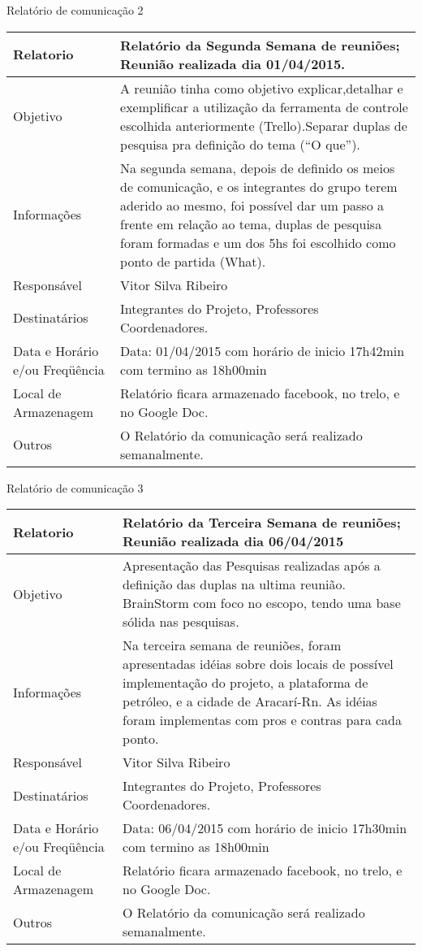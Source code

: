 \begin{center}
{\large Relatório de comunicação 2}
\begin{table}[h]
\begin{tabular}{|p{6cm}|p{9cm}|}\hline
Relatorio & Relatório da Segunda Semana de reuniões; Reunião realizada dia 01/04/2015.\\ \hline
Objetivo & A reunião tinha como objetivo explicar,detalhar e exemplificar a utilização da ferramenta de controle escolhida anteriormente (Trello).Separar duplas de pesquisa pra definição do tema (“O que”).\\ \hline
Informações & Na segunda semana, depois de definido os meios de comunicação, e os integrantes do grupo terem aderido ao mesmo, foi possível dar um passo a frente em relação ao tema, duplas de pesquisa foram formadas e um dos 5hs foi escolhido como ponto de partida (What).\\ \hline
Responsável & Vitor Silva Ribeiro\\ \hline
Destinatários & Integrantes do Projeto, Professores Coordenadores.\\ \hline
Data e Horário e/ou Freqüência & Data: 01/04/2015 com horário de inicio 17h42min com termino as 18h00min\\ \hline
Local de Armazenagem & Relatório ficara armazenado facebook, no trelo, e no Google Doc.\\ \hline
Outros & O Relatório da comunicação será realizado semanalmente.\\ \hline
\end{tabular}
\end{table}
\newpage

{\large Relatório de comunicação 3}
\begin{table}[h]
\begin{tabular}{|p{6cm}|p{9cm}|}\hline
Relatorio & Relatório da Terceira Semana de reuniões; Reunião realizada dia 06/04/2015\\ \hline
Objetivo & Apresentação das Pesquisas realizadas após a definição das duplas na ultima reunião. BrainStorm com foco  no escopo, tendo uma base sólida nas pesquisas.\\ \hline
Informações & Na terceira semana de reuniões, foram apresentadas idéias sobre dois locais de possível implementação do projeto, a plataforma de petróleo, e a cidade de Aracarí-Rn. As idéias foram implementas com pros e contras para cada ponto.\\ \hline
Responsável & Vitor Silva Ribeiro\\ \hline
Destinatários & Integrantes do Projeto, Professores Coordenadores.\\ \hline
Data e Horário e/ou Freqüência &Data: 06/04/2015 com horário de inicio 17h30min com termino as 18h00min\\ \hline
Local de Armazenagem & Relatório ficara armazenado facebook, no trelo, e no Google Doc.\\ \hline
Outros & O Relatório da comunicação será realizado semanalmente.\\ \hline
\end{tabular}
\end{table}


\end{center}
